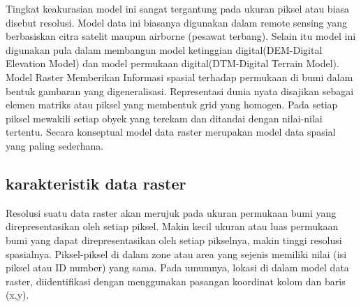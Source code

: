 Tingkat keakurasian model ini sangat tergantung pada ukuran piksel atau biasa disebut resolusi.
Model data ini biasanya digunakan dalam remote sensing yang berbasiskan citra satelit maupun airborne (pesawat terbang).
Selain itu model ini digunakan pula dalam membangun model ketinggian digital(DEM-Digital Elevation Model) dan model permukaan digital(DTM-Digital Terrain Model).
Model Raster Memberikan Informasi spasial terhadap permukaan di bumi dalam bentuk gambaran yang digeneralisasi.
Representasi dunia nyata disajikan sebagai elemen matriks atau piksel yang membentuk grid  yang homogen. 
Pada setiap piksel mewakili setiap obyek yang terekam dan ditandai dengan nilai-nilai tertentu.
Secara konseptual model data raster merupakan model data spasial yang paling sederhana. 

\subsection{karakteristik data raster}
Resolusi suatu data raster akan merujuk pada ukuran permukaan bumi yang direpresentasikan oleh setiap piksel. 
Makin kecil ukuran atau luas permukaan bumi yang dapat direpresentasikan oleh setiap pikselnya, 
makin tinggi resolusi spasialnya.
Piksel-piksel di dalam zone atau area yang sejenis memiliki nilai (isi piksel atau ID number) yang sama. 
Pada umumnya, lokasi di dalam model data raster, diidentifikasi dengan menggunakan pasangan koordinat kolom dan baris (x,y).

